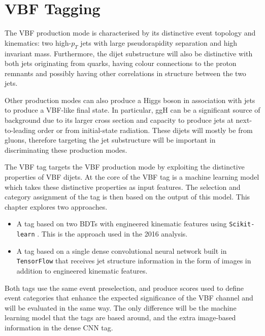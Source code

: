 \section{VBF Tagging}
The VBF production mode is characterised by its distinctive event topology and kinematics: two high-$p_{T}$ jets with large pseudorapidity separation and high invariant mass. Furthermore, the dijet substructure will also be distinctive with both jets originating from quarks, having colour connections to the proton remnants and possibly having other correlations in structure between the two jets. 

Other production modes can also produce a Higgs boson in association with jets to produce a VBF-like final state. 
In particular, ggH can be a significant source of background due to its larger cross section and capacity to produce jets at next-to-leading order or from initial-state radiation. 
These dijets will mostly be from gluons, therefore targeting the jet substructure will be important in discriminating these production modes. 


The VBF tag targets the VBF production mode by exploiting the distinctive properties of VBF dijets. 
At the core of the VBF tag is a machine learning model which takes these distinctive properties as input features. 
The selection and category assignment of the tag is then based on the output of this model.
This chapter explores two approaches.
\begin{itemize}[noitemsep]
    \item A tag based on two BDTs with engineered kinematic features using \texttt{Scikit-learn} \cite{SKLearn}. This is the approach used in the 2016 \Hgg analysis. 
    \item A tag based on a single dense convolutional neural network built in \texttt{TensorFlow} \cite{TensorFlow} that receives jet structure information in the form of images in addition to engineered kinematic features. 
\end{itemize}
Both tags use the same event preselection, and produce scores used to define event categories that enhance the expected significance of the VBF channel and will be evaluated in the same way. The only difference will be the machine learning model that the tags are based around, and the extra image-based information in the dense CNN tag.  

